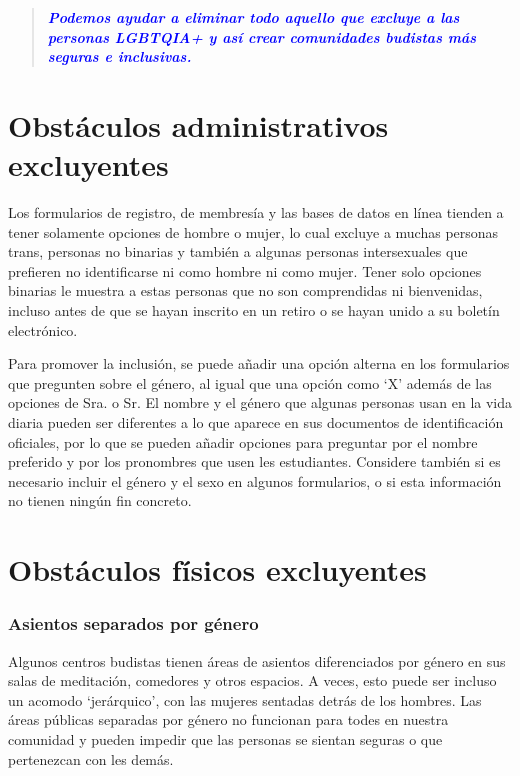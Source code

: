 \documentclass[12pt,openany]{book}
\begin{document}
\begin{quote}
\centering
\doublespacing
\textit{\Large \textcolor{blue}{\textbf{Podemos ayudar a eliminar todo aquello que excluye a las personas \mbox{LGBTQIA+} y así crear comunidades budistas más seguras e inclusivas.}}}
\end{quote}

\section*{Obstáculos administrativos excluyentes}

Los formularios de registro, de membresía y las bases de datos en línea tienden a tener solamente opciones de hombre o mujer, lo cual excluye a muchas personas trans, personas no binarias y también a algunas personas intersexuales que prefieren no identificarse ni como hombre ni como mujer. Tener solo opciones binarias le muestra a estas personas que no son comprendidas ni bienvenidas, incluso antes de que se hayan inscrito en un retiro o se hayan unido a su boletín electrónico.

Para promover la inclusión, se puede añadir una opción alterna en los formularios que pregunten sobre el género, al igual que una opción como `X' además de las opciones de Sra. o Sr. El nombre y el género que algunas personas usan en la vida diaria pueden ser diferentes a lo que aparece en sus documentos de identificación oficiales, por lo que se pueden añadir opciones para preguntar por el nombre preferido y por los pronombres que usen les estudiantes. Considere también si es necesario incluir el género y el sexo en algunos formularios, o si esta información no tienen ningún fin concreto.

\section*{Obstáculos físicos excluyentes}

\subsubsection*{Asientos separados por género}

Algunos centros budistas tienen áreas de asientos diferenciados por género en sus salas de meditación, comedores y otros espacios. A veces, esto puede ser incluso un acomodo `jerárquico', con las mujeres sentadas detrás de los hombres. Las áreas públicas separadas por género no funcionan para todes en nuestra comunidad y pueden impedir que las personas se sientan seguras o que pertenezcan con les demás.
\end{document}

